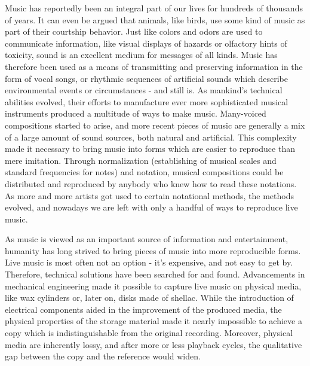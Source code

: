 Music has reportedly been an integral part of our lives for hundreds of thousands of years. It can even be argued that animals, like birds, use some kind of music as part of their courtship behavior. Just like colors and odors are used to communicate information, like visual displays of hazards or olfactory hints of toxicity, sound is an excellent medium for messages of all kinds. Music has therefore been used as a means of transmitting and preserving information in the form of vocal songs, or rhythmic sequences of artificial sounds which describe environmental events or circumstances - and still is. As mankind's technical abilities evolved, their efforts to manufacture ever more sophisticated musical instruments produced a multitude of ways to make music. Many-voiced compositions started to arise, and more recent pieces of music are generally a mix of a large amount of sound sources, both natural and artificial. This complexity made it necessary to bring music into forms which are easier to reproduce than mere imitation. Through normalization (establishing of musical scales and standard frequencies for notes) and notation, musical compositions could be distributed and reproduced by anybody who knew how to read these notations. As more and more artists got used to certain notational methods, the methods evolved, and nowadays we are left with only a handful of ways to reproduce live music.

As music is viewed as an important source of information and entertainment, humanity has long strived to bring pieces of music into more reproducible forms. Live music is most often not an option - it's expensive, and not easy to get by. Therefore, technical solutions have been searched for and found. Advancements in mechanical engineering made it possible to capture live music on physical media, like wax cylinders or, later on, disks made of shellac. While the introduction of electrical components aided in the improvement of the produced media, the physical properties of the storage material made it nearly impossible to achieve a copy which is indistinguishable from the original recording. Moreover, physical media are inherently lossy, and after more or less playback cycles, the qualitative gap between the copy and the reference would widen.

